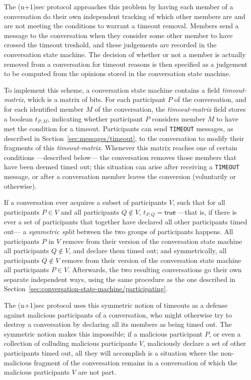 \documentclass{article}
\def\message#1{\texttt{#1}}
\def\smfield#1{\textsl{#1}}
\def\type#1{\textsf{#1}}
\begin{document}
The (n+1)sec protocol approaches this problem by having each member of a conversation do their own independent tracking of which other members are and are not meeting the conditions to warrant a timeout removal.
Members send a message to the conversation when they consider some other member to have crossed the timeout treshold, and these judgements are recorded in the conversation state machine.
The decision of whether or not a member is actually removed from a conversation for timeout reasons is then specified as a judgement to be computed from the opinions stored in the conversation state machine.


To implement this scheme, a conversation state machine contains a field \smfield{timeout-matrix}, which is a matrix of bits.
For each participant $P$ of the conversation, and for each identified member $M$ of the conversation, the \smfield{timeout-matrix} field stores a \type{boolean} $t_{P,M}$, indicating whether participant $P$ considers member $M$ to have met the condition for a timeout.
Participants can send \message{TIMEOUT} messages, as described in Section~\ref{sec:messages/timeout}, to the conversation to modify their fragments of this \smfield{timeout-matrix}.
Whenever this matrix reaches one of certain conditions ---described below--- the conversation removes those members that have been deemed timed out; this situation can arise after receiving a \message{TIMEOUT} message, or after a conversation member leaves the conversion (voluntarily or otherwise).

If a conversation ever acquires a subset of participants $V$, such that for all participants $P \in V$ and all participants $Q \not\in V$, $t_{P,Q} = \textsf{true}$ ---that is, if there is ever a set of participants that together have declared all other participants timed out--- a \emph{symmetric split} between the two groups of participants happens.
All participants $P$ in $V$ remove from their version of the conversation state machine all participants $Q \not\in V$, and declare them timed out; and symmetrically, all participants $Q \not\in V$ remove from their version of the conversation state machine all participants $P \in V$.
Afterwards, the two resulting conversations go their own separate independent ways, using the same procedure as the one described in Section~\ref{sec:conversation-state-machine/participating}.

The (n+1)sec protocol uses this symmetric notion of timeouts as a defense against malicious participants of a conversation, who might otherwise try to destroy a conversation by declaring all its members as being timed out.
The symmetric notion makes this impossible; if a malicious participant $P$, or even a collection of colluding malicious participants $V$, maliciously declare a set of other participants timed out, all they will accomplish is a situation where the non-malicious fragment of the conversation remains in a conversation of which the malicious participants $V$ are not part.
\end{document}
